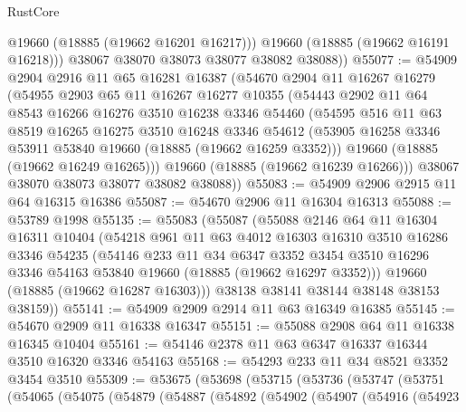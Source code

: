 \begin{lexlean}{RustCore}
\begin{coremodule}
            @19660
            (@18885 (@19662 @16201 @16217)))
          @19660
          (@18885 (@19662 @16191 @16218)))
        @38067
        @38070
        @38073
        @38077
        @38082
        @38088))
@55077 := @54909
    @2904
    @2916
    @11
    @65
    @16281
    @16387
    (@54670
      @2904
      @11
      @16267
      @16279
      (@54955
        @2903
        @65
        @11
        @16267
        @16277
        @10355
        (@54443
          @2902
          @11
          @64
          @8543
          @16266
          @16276
          @3510
          @16238
          @3346
          @54460
          (@54595
            @516
            @11
            @63
            @8519
            @16265
            @16275
            @3510
            @16248
            @3346
            @54612
            (@53905 @16258 @3346 @53911 @53840 @19660 (@18885 (@19662 @16259 @3352)))
            @19660
            (@18885 (@19662 @16249 @16265)))
          @19660
          (@18885 (@19662 @16239 @16266)))
        @38067
        @38070
        @38073
        @38077
        @38082
        @38088))
@55083 := @54909 @2906 @2915 @11 @64 @16315 @16386
@55087 := @54670 @2906 @11 @16304 @16313
@55088 := @53789 @1998
@55135 := @55083
    (@55087
      (@55088
        @2146
        @64
        @11
        @16304
        @16311
        @10404
        (@54218
          @961
          @11
          @63
          @4012
          @16303
          @16310
          @3510
          @16286
          @3346
          @54235
          (@54146
            @233
            @11
            @34
            @6347
            @3352
            @3454
            @3510
            @16296
            @3346
            @54163
            @53840
            @19660
            (@18885 (@19662 @16297 @3352)))
          @19660
          (@18885 (@19662 @16287 @16303)))
        @38138
        @38141
        @38144
        @38148
        @38153
        @38159))
@55141 := @54909 @2909 @2914 @11 @63 @16349 @16385
@55145 := @54670 @2909 @11 @16338 @16347
@55151 := @55088 @2908 @64 @11 @16338 @16345 @10404
@55161 := @54146 @2378 @11 @63 @6347 @16337 @16344 @3510 @16320 @3346 @54163
@55168 := @54293 @233 @11 @34 @8521 @3352 @3454 @3510
@55309 := @53675
    (@53698
      (@53715
        (@53736
          (@53747
            (@53751
              (@54065
                (@54075
                  (@54879
                    (@54887
                      (@54892
                        (@54902
                          (@54907
                            (@54916
                              (@54923

\end{coremodule}
\end{lexlean}
